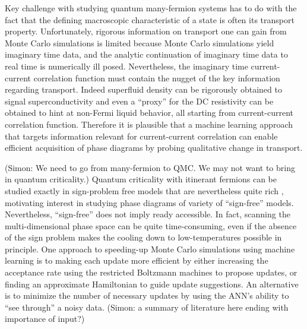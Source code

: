 \documentclass[amsmath,amssymb, aps, prl, twocolumn]{revtex4-1}
\begin{document}
\maketitle



Key challenge with studying quantum many-fermion systems has to do with the fact that the defining macroscopic characteristic of a state is often its transport property. Unfortunately, 
rigorous information on transport one can gain from Monte Carlo simulations is limited because Monte Carlo simulations yield imaginary time data, and the analytic continuation of imaginary time data to real time is numerically ill posed. Nevertheless, the imaginary time current-current correlation function must contain the nugget of the key information regarding transport. Indeed 
superfluid density can be rigorously obtained to signal superconductivity\cite{Scalapino1992,Scalapino1993} and even a “proxy” for the DC resistivity can be obtained to hint at non-Fermi liquid behavior\cite{Lederer2017}, all starting from current-current correlation function. Therefore it is plausible that a machine learning approach that targets information relevant for current-current correlation can enable efficient acquisition of phase diagrams by probing qualitative change in transport.

{\color{red} (Simon: We need to go from many-fermion to QMC. We may not want to bring in quantum criticality.)} Quantum criticality with itinerant fermions can be studied exactly in sign-problem free models that are nevertheless quite rich \cite{Berg2012,Schattner2016a,Gerlach2017,Xu2017a,Lederer2017,Li2016,Li2017,Jiang2017}, motivating interest in studying phase diagrams of variety of  “sign-free” models. Nevertheless, ``sign-free'' does not imply ready accessible. 
In fact, scanning the multi-dimensional phase space can be quite time-consuming, even if the absence of the sign problem makes the cooling down to low-temperatures possible in principle. One approach to speeding-up Monte Carlo simulations using machine learning is to making each update more efficient by either increasing the acceptance rate using the restricted Boltzmann machines to propose updates\cite{Huang2017}, or finding an approximate Hamiltonian to guide update suggestions\cite{Liu2017}. 
An alternative is to minimize the number of necessary updates by using the ANN’s ability to “see through” a noisy data. {\color{red} (Simon: a summary of literature here ending with importance of input?)}
\end{document}
